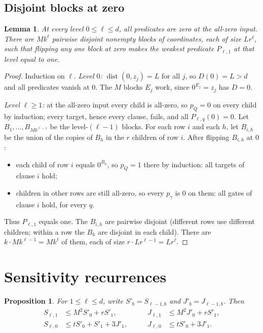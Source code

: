 \documentclass[11pt]{article}
\newtheorem{lemma}[theorem]{Lemma}
\newtheorem{proposition}[theorem]{Proposition}
\theoremstyle{definition}
\theoremstyle{remark}
\begin{document}
\subsection{Disjoint blocks at zero}
\begin{lemma}\label{lem:blocks}
At every level \(0\le\ell\le d\), all predicates are zero at the
all-zero input. There are \(Mk^\ell\) pairwise disjoint nonempty blocks
of coordinates, each of size \(Lr^\ell\), such that flipping any one
block at zero makes the weakest predicate \(P_{\ell,1}\) at that level equal to one.
\end{lemma}
\begin{proof}
Induction on $\ell$. \emph{Level $0$:}
$\operatorname{dist}(0,z_j)=L$ for all $j$, so \(D(0)=L>d\) and all
predicates vanish at $0$. The $M$ blocks \(E_j\) work, since \(0^{E_j}=z_j\)
has $D=0$.

\emph{Level $\ell\ge1$:} at the all-zero input every child is all-zero, so
$p_Q=0$ on every child by induction; every target, hence every clause, fails,
and all $P_{\ell,q}(0)=0$. Let \(B_1,\ldots,B_{Mk^{\ell-1}}\) be the
level-$(\ell-1)$ blocks. For each row \(i\) and each \(h\), let $B_{i,h}$ be
the union of the copies of \(B_h\) in the \(r\) children of row \(i\). After
flipping $B_{i,h}$ at $0$:
\begin{itemize}[leftmargin=*,itemsep=1pt]
\item each child of row $i$ equals $0^{B_h}$, so $p_Q=1$ there by induction:
 all targets of clause $i$ hold;
\item children in other rows are still all-zero, so every $p_\gamma$ is $0$
 on them: all gates of clause $i$ hold, for every $q$.
\end{itemize}
Thus \(P_{\ell,1}\) equals one. The $B_{i,h}$ are pairwise disjoint
(different rows use different children; within a row the $B_h$ are disjoint in
each child). There are \(k\cdot Mk^{\ell-1}=Mk^\ell\) of them, each of size
\(r\cdot Lr^{\ell-1}=Lr^\ell\).
\end{proof}

\section{Sensitivity recurrences}
\label{sec:recurrences}

\begin{proposition}\label{prop:recurrences}
For $1\leq \ell\leq d$, write
$S'_b=S_{\ell-1,b}$ and $J'_b=J_{\ell-1,b}$.  Then
\begin{equation}\label{eq:recurrences}
\begin{aligned}
 S_{\ell,1}&\leq M^2S'_0+rS'_1,
 &\qquad J_{\ell,1}&\leq M^2J'_0+rS'_1,\\
 S_{\ell,0}&\leq tS'_0+S'_1+3J'_1,
 &\qquad J_{\ell,0}&\leq tS'_0+3J'_1.
\end{aligned}
\end{equation}
\end{proposition}
\end{document}
